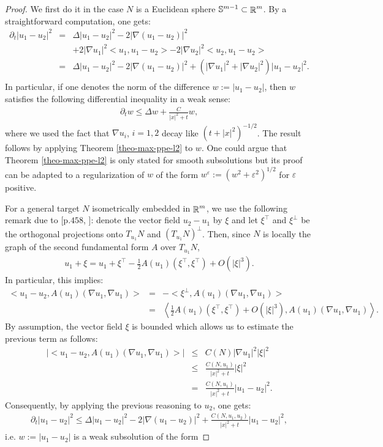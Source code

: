 \documentclass[a4paper,11pt,reqno]{amsart}
\def\R{\mathop{\rm \mathbb{R}}\nolimits}
\begin{document}
\begin{proof}
We first do it in the case $N$ is a Euclidean sphere $\mathbb{S}^{m-1}\subset\R^m$. By a straightforward computation, one gets:
\begin{eqnarray*}
\partial_t|u_1-u_2|^2&=&\Delta|u_1-u_2|^2-2|\nabla (u_1-u_2)|^2\\
&&+2|\nabla u_1|^2<u_1,u_1-u_2>-2|\nabla u_2|^2<u_2,u_1-u_2>\\
&=&\Delta|u_1-u_2|^2-2|\nabla (u_1-u_2)|^2+(|\nabla u_1|^2+|\nabla u_2|^2)|u_1-u_2|^2.\\
\end{eqnarray*}
In particular, if one denotes the norm of the difference $w:=|u_1-u_2|$, then $w$ satisfies the following differential inequality in a weak sense:
\begin{eqnarray*}
\partial_tw\leq \Delta w+\frac{C}{|x|^2+t}w,
\end{eqnarray*}
where we used the fact that $\nabla u_i$, $i=1,2$ decay like $\left(t+|x|^2\right)^{-1/2}$. The result follows by applying Theorem \ref{theo-max-ppe-l2} to $w$. One could argue that Theorem \ref{theo-max-ppe-l2} is only stated for smooth subsolutions but its proof can be adapted to a regularization of $w$ of the form $w^{\varepsilon}:=(w^2+\varepsilon^2)^{1/2}$ for $\varepsilon$ positive.

For a general target $N$ isometrically embedded in $\R^m$, we use the following remark due to [p.$ 458$, \cite{Har-Mou}]: denote the vector field $u_2-u_1$ by $\xi$ and let $\xi^{\top}$ and $\xi^{\perp}$ be the orthogonal projections onto $T_{u_1}N$ and $(T_{u_1}N)^{\perp}$. Then, since $N$ is locally the graph of the second fundamental form $A$ over $T_{u_1}N$,
\begin{eqnarray*}
u_1+\xi=u_1+\xi^{\top}-\frac{1}{2}A(u_1)(\xi^{\top},\xi^{\top})+\textit{O}(|\xi|^3).
\end{eqnarray*}
In particular, this implies:
\begin{eqnarray*}
<u_1-u_2,A(u_1)(\nabla u_1,\nabla u_1)>&=&-<\xi^{\perp},A(u_1)(\nabla u_1,\nabla u_1)>\\
&=&\left<\frac{1}{2}A(u_1)(\xi^{\top},\xi^{\top})+\textit{O}(|\xi|^3),A(u_1)(\nabla u_1,\nabla u_1)\right>.
\end{eqnarray*}
By assumption, the vector field $\xi$ is bounded which allows us to estimate the previous term as follows:
\begin{eqnarray*}
|<u_1-u_2,A(u_1)(\nabla u_1,\nabla u_1)>|&\leq&C(N)|\nabla u_1|^2|\xi|^2\\
&\leq&\frac{C(N,u_1)}{|x|^2+t}|\xi|^2\\
&=&\frac{C(N,u_1)}{|x|^2+t}|u_1-u_2|^2.
\end{eqnarray*}
Consequently, by applying the previous reasoning to $u_2$, one gets:
\begin{eqnarray*}
\partial_t|u_1-u_2|^2\leq \Delta |u_1-u_2|^2-2|\nabla(u_1-u_2)|^2+\frac{C(N,u_1,u_2)}{|x|^2+t}|u_1-u_2|^2,
\end{eqnarray*}
i.e. $w:=|u_1-u_2|$ is a weak subsolution of the form


\end{proof}
\end{document}
